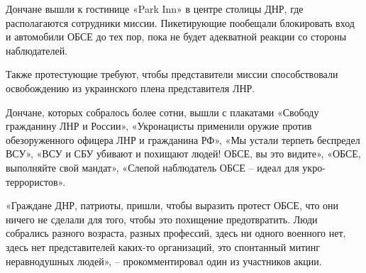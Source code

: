 Дончане вышли к гостинице «Park Inn» в центре столицы ДНР, где располагаются
сотрудники миссии. Пикетирующие пообещали блокировать вход и автомобили ОБСЕ до
тех пор, пока не будет адекватной реакции со стороны наблюдателей.

Также протестующие требуют, чтобы представители миссии способствовали
освобождению из украинского плена представителя ЛНР. 

Дончане, которых собралось более сотни, вышли с плакатами «Свободу гражданину
ЛНР и России», «Укронацисты применили оружие против обезоруженного офицера ЛНР
и гражданина РФ», «Мы устали терпеть беспредел ВСУ», «ВСУ и СБУ убивают и
похищают людей! ОБСЕ, вы это видите», «ОБСЕ, выполняйте свой мандат», «Слепой
наблюдатель ОБСЕ – идеал для укро-террористов».

«Граждане ДНР, патриоты, пришли, чтобы выразить протест ОБСЕ, что они ничего не
сделали для того, чтобы это похищение предотвратить. Люди собрались разного
возраста, разных профессий, здесь ни одного военного нет, здесь нет
представителей каких-то организаций, это спонтанный митинг неравнодушных
людей», – прокомментировал один из участников акции.
